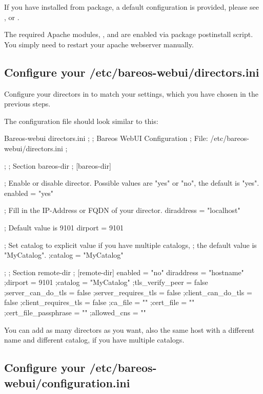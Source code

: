 
If you have installed from package, a default configuration is provided, please see ,  or .

The required Apache modules, ,  and  are enabled via package postinstall script. You simply need to restart your apache webserver manually.

\subsection{Configure your /etc/bareos-webui/directors.ini}

Configure your directors in  to match your settings, which you have chosen in the previous steps.

The configuration file  should look similar to this:

\begin{bconfig}{Bareos-webui directors.ini}
;
; Bareos WebUI Configuration
; File: /etc/bareos-webui/directors.ini
;

;
; Section bareos-dir
;
[bareos-dir]

; Enable or disable director. Possible values are "yes" or "no", the default is "yes".
enabled = "yes"

; Fill in the IP-Address or FQDN of your director.
diraddress = "localhost"

; Default value is 9101
dirport = 9101

; Set catalog to explicit value if you have multiple catalogs,
; the default value is "MyCatalog".
;catalog = "MyCatalog"

;
; Section remote-dir
;
[remote-dir]
enabled = "no"
diraddress = "hostname"
;dirport = 9101
;catalog = "MyCatalog"
;tls_verify_peer = false
;server_can_do_tls = false
;server_requires_tls = false
;client_can_do_tls = false
;client_requires_tls = false
;ca_file = ""
;cert_file = ""
;cert_file_passphrase = ""
;allowed_cns = ""
\end{bconfig}

You can add as many directors as you want, also the same host with a different name and different catalog, if you have multiple catalogs.

\subsection{Configure your /etc/bareos-webui/configuration.ini}


